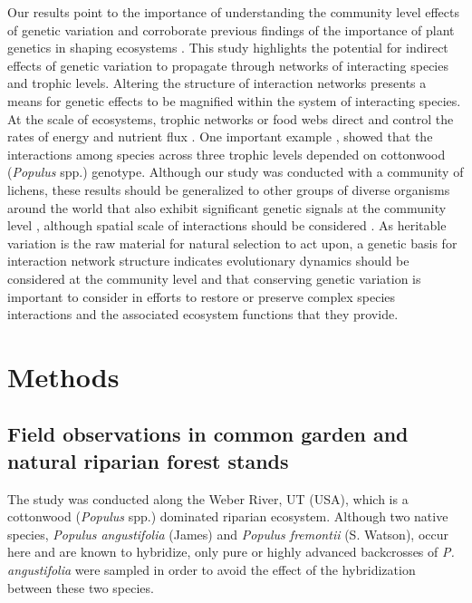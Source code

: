 \documentclass[fleqn,10pt]{wlscirep}
\begin{document}
Our results point to the importance of understanding the community
level effects of genetic variation and corroborate previous findings
of the importance of plant genetics in shaping ecosystems
\cite{Whitham2006a}.  This study highlights the potential for indirect
effects of genetic variation to propagate through networks of
interacting species and trophic levels. Altering the structure of
interaction networks presents a means for genetic effects to be
magnified within the system of interacting species. At the scale of
ecosystems, trophic networks or food webs direct and control the rates
of energy and nutrient flux \cite{Borgatti2006}. One important example
\cite{Smith2011}, showed that the interactions among species across
three trophic levels depended on cottonwood (\textit{Populus} spp.)
genotype. Although our study was conducted with a community of
lichens, these results should be generalized to other groups of
diverse organisms around the world that also exhibit significant
genetic signals at the community level \cite{Rowntree2011,
  Whitham2012}, although spatial scale of interactions should be
considered \cite{Zook2010}. As heritable variation is the raw material
for natural selection to act upon, a genetic basis for interaction
network structure indicates evolutionary dynamics should be considered
at the community level and that conserving genetic variation is
important to consider in efforts to restore or preserve complex
species interactions and the associated ecosystem functions
\cite{Evans2013} that they provide.



\section*{Methods}


\subsection*{Field observations in common garden and natural riparian
  forest stands}

The study was conducted along the Weber River, UT (USA), which is a
cottonwood (\textit{Populus} spp.) dominated riparian
ecosystem. Although two native species, \textit{Populus angustifolia}
(James) and \textit{Populus fremontii} (S. Watson), occur here and are
known to hybridize, only pure or highly advanced backcrosses of
\textit{P. angustifolia} were sampled in order to avoid the effect of
the hybridization between these two species.
\end{document}
